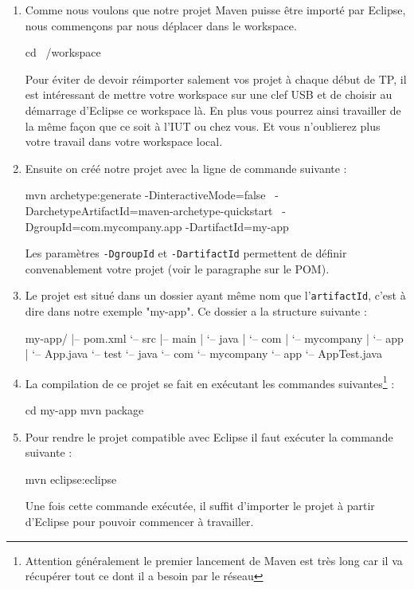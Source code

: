 \documentclass[a4paper,11pt]{article}
\begin{document}
\begin{enumerate}
  \item Comme nous voulons que notre projet Maven puisse être importé par Eclipse, nous commençons par nous déplacer dans le workspace.
  \begin{code_shell}
cd ~/workspace
  \end{code_shell}
  Pour éviter de devoir réimporter salement vos projet à chaque début de TP, il est intéressant de mettre votre workspace 
  sur une clef USB et de choisir au démarrage d'Eclipse ce workspace là. En plus vous pourrez ainsi travailler de la même 
  façon que ce soit à l'IUT ou chez vous. Et vous n'oublierez plus votre travail dans votre workspace local.
  \item Ensuite on créé notre projet avec la ligne de commande suivante :
  \begin{code_shell}
mvn archetype:generate -DinteractiveMode=false \
-DarchetypeArtifactId=maven-archetype-quickstart \
-DgroupId=com.mycompany.app -DartifactId=my-app 
  \end{code_shell}
  Les paramètres \texttt{-DgroupId} et \texttt{-DartifactId} permettent de définir convenablement votre projet (voir le paragraphe sur le POM).
  
  \item Le projet est situé dans un dossier ayant même nom que l'\texttt{artifactId}, c'est à dire dans notre exemple "my-app". 
  Ce dossier a la structure suivante :
  \begin{code_shell}
my-app/
|-- pom.xml
`-- src
    |-- main
    |   `-- java
    |       `-- com
    |           `-- mycompany
    |               `-- app
    |                   `-- App.java
    `-- test
        `-- java
            `-- com
                `-- mycompany
                    `-- app
                        `-- AppTest.java
  \end{code_shell}
  \item La compilation de ce projet se fait en exécutant les commandes suivantes\footnote{Attention généralement le 
  premier lancement de Maven est très long car il va récupérer tout ce dont il a besoin par le réseau} :
  \begin{code_shell}
cd my-app
mvn package
  \end{code_shell}
  \item Pour rendre le projet compatible avec Eclipse il faut exécuter la commande suivante : 
  \begin{code_shell}
mvn eclipse:eclipse
  \end{code_shell}
  Une fois cette commande exécutée, il suffit d'importer le projet à partir d'Eclipse pour pouvoir commencer à travailler.
\end{enumerate}
\end{document}
